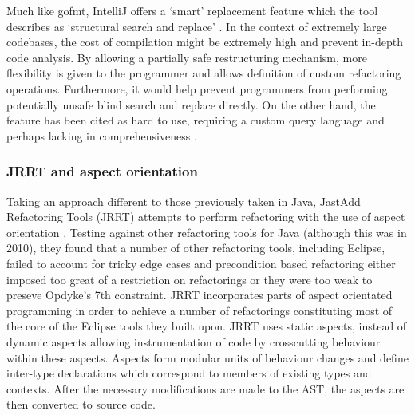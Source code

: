 Much like gofmt, IntelliJ offers a `smart' replacement feature which the tool describes as `structural search and replace' \cite{jemerov2008implementing}. In the context of extremely large codebases, the cost of compilation might be extremely high and prevent in-depth code analysis. By allowing a partially safe restructuring mechanism, more flexibility is given to the programmer and allows definition of custom refactoring operations. Furthermore, it would help prevent programmers from performing potentially unsafe blind search and replace directly. On the other hand, the feature has been cited as hard to use, requiring a custom query language and perhaps lacking in comprehensiveness \cite{jemerov2008implementing}.

\subsubsection{JRRT and aspect orientation}
Taking an approach different to those previously taken in Java, JastAdd Refactoring Tools (JRRT) attempts to perform refactoring with the use of aspect orientation \cite{schafer2010specification}. Testing against other refactoring tools for Java (although this was in 2010), they found that a number of other refactoring tools, including Eclipse, failed to account for tricky edge cases and precondition based refactoring either imposed too great of a restriction on refactorings or they were too weak to preseve Opdyke's 7th constraint. JRRT incorporates parts of aspect orientated programming in order to achieve a number of refactorings constituting most of the core of the Eclipse tools they built upon. JRRT uses static aspects, instead of dynamic aspects allowing instrumentation of code by crosscutting behaviour within these aspects. Aspects form modular units of behaviour changes and define inter-type declarations which correspond to members of existing types and contexts. After the necessary modifications are made to the AST, the aspects are then converted to source code.

